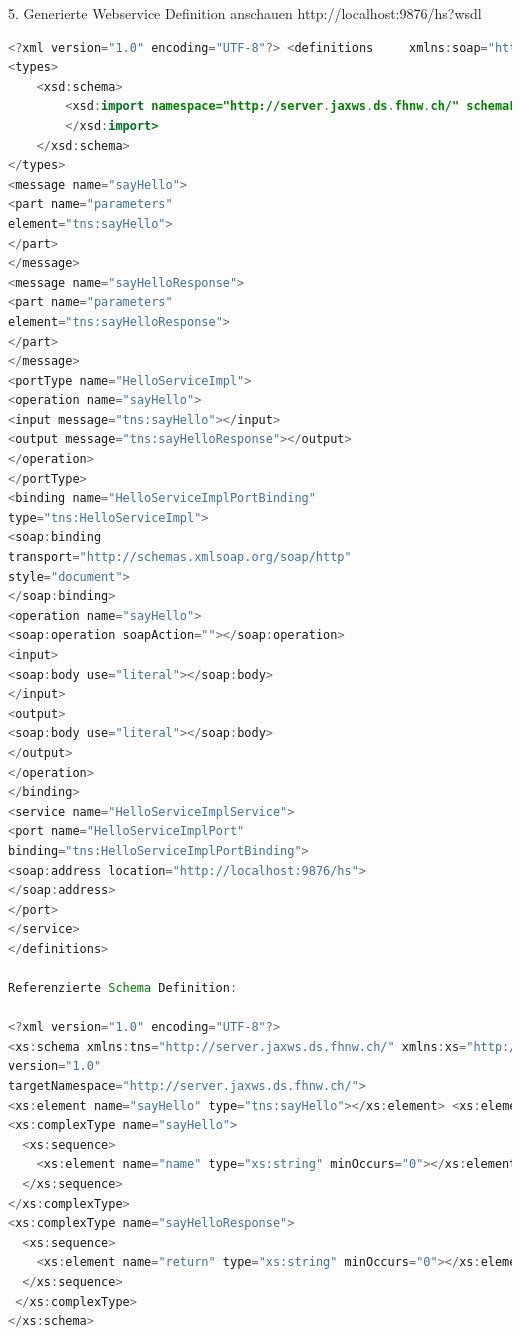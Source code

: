 \documentclass[10pt]{article}
\begin{document}
5. Generierte Webservice Definition anschauen
http://localhost:9876/hs?wsdl
\begin{lstlisting}[language=Java, caption=WSDL, style=JavaStyle]
<?xml version="1.0" encoding="UTF-8"?> <definitions 	xmlns:soap="http://schemas.xmlsoap.org/wsdl/soap/" 	xmlns:tns="http://server.jaxws.ds.fhnw.ch/" 	xmlns:xsd="http://www.w3.org/2001/XMLSchema" 	xmlns="http://schemas.xmlsoap.org/wsdl/" 	targetNamespace="http://server.jaxws.ds.fhnw.ch/" 	name="HelloServiceImplService"> 
<types> 
	<xsd:schema> 
		<xsd:import namespace="http://server.jaxws.ds.fhnw.ch/" schemaLocation="http://localhost:9876/hs?xsd=1"> 
		</xsd:import> 
	</xsd:schema> 
</types>
<message name="sayHello">
<part name="parameters"
element="tns:sayHello">
</part>
</message>
<message name="sayHelloResponse">
<part name="parameters"
element="tns:sayHelloResponse">
</part>
</message>
<portType name="HelloServiceImpl">
<operation name="sayHello">
<input message="tns:sayHello"></input>
<output message="tns:sayHelloResponse"></output>
</operation>
</portType>
<binding name="HelloServiceImplPortBinding" 
type="tns:HelloServiceImpl"> 
<soap:binding 
transport="http://schemas.xmlsoap.org/soap/http" 
style="document"> 
</soap:binding> 
<operation name="sayHello"> 
<soap:operation soapAction=""></soap:operation> 
<input> 
<soap:body use="literal"></soap:body> 
</input> 
<output> 
<soap:body use="literal"></soap:body> 
</output> 
</operation> 
</binding>
<service name="HelloServiceImplService">
<port name="HelloServiceImplPort"
binding="tns:HelloServiceImplPortBinding">
<soap:address location="http://localhost:9876/hs">
</soap:address>
</port>
</service>
</definitions>

Referenzierte Schema Definition:

<?xml version="1.0" encoding="UTF-8"?>
<xs:schema xmlns:tns="http://server.jaxws.ds.fhnw.ch/" xmlns:xs="http://www.w3.org/2001/XMLSchema"
version="1.0"
targetNamespace="http://server.jaxws.ds.fhnw.ch/">
<xs:element name="sayHello" type="tns:sayHello"></xs:element> <xs:element name="sayHelloResponse" type="tns:sayHelloResponse"></xs:element> 
<xs:complexType name="sayHello">
  <xs:sequence> 
    <xs:element name="name" type="xs:string" minOccurs="0"></xs:element> 
  </xs:sequence> 
</xs:complexType> 
<xs:complexType name="sayHelloResponse"> 
  <xs:sequence> 
    <xs:element name="return" type="xs:string" minOccurs="0"></xs:element> 
  </xs:sequence>
 </xs:complexType> 
</xs:schema>

\end{lstlisting}
\end{document}
